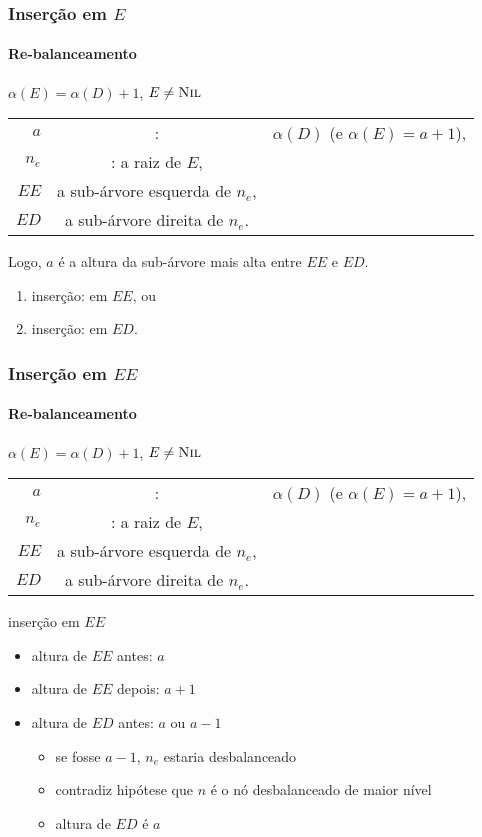 \documentclass{beamer}
\begin{document}
\begin{frame}

\frametitle{Inserção em $E$}
\framesubtitle{Re-balanceamento}

$\alpha(E) = \alpha(D)+1$, $E \neq \textnormal{\scshape Nil}$

\begin{tabular}{rcl}
$a$ & : & $\alpha(D)$ (e $\alpha(E) = a+1$), \\
$n_e$ & : a raiz de $E$, \\
$EE$ & a sub-árvore esquerda de $n_e$, \\ 
$ED$ & a sub-árvore direita de $n_e$.
\end{tabular}

Logo, $a$ é a altura da sub-árvore mais alta entre $EE$ e $ED$.

\begin{enumerate}

\item inserção: em $EE$, ou

\item inserção: em $ED$.

\end{enumerate}

\end{frame}

\begin{frame}

\frametitle{Inserção em $EE$}
\framesubtitle{Re-balanceamento}

$\alpha(E) = \alpha(D)+1$, $E \neq \textnormal{\scshape Nil}$

\begin{tabular}{rcl}
$a$ & : & $\alpha(D)$ (e $\alpha(E) = a+1$), \\
$n_e$ & : a raiz de $E$, \\
$EE$ & a sub-árvore esquerda de $n_e$, \\ 
$ED$ & a sub-árvore direita de $n_e$.
\end{tabular}

inserção em $EE$

\begin{itemize}

\item altura de $EE$ antes: $a$

\item altura de $EE$ depois: $a+1$

\item altura de $ED$ antes: $a$ ou $a-1$

\begin{itemize}

\item se fosse $a-1$, $n_e$ estaria desbalanceado

\item contradiz hipótese que $n$ é o nó desbalanceado de maior nível

\item altura de $ED$ é $a$

\end{itemize}

\end{itemize}

\end{frame}
\end{document}
